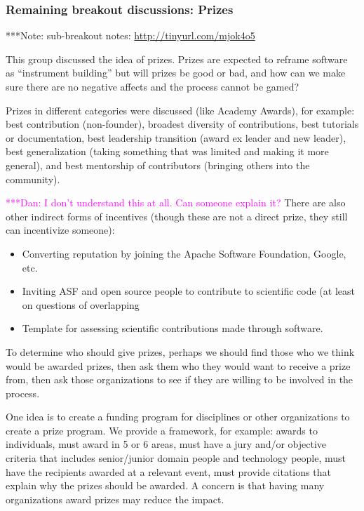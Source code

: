 \documentclass[11pt, oneside]{amsart}
\newcommand{\note}[1]{ {\textcolor{blueish}    { ***Note:      #1 }}}
\newcommand{\katznote}[1]{ {\textcolor{magenta}    { ***Dan:      #1 }}}
\begin{document}
\subsubsection{Remaining breakout discussions: Prizes}\label{sec:prizes}
\note{sub-breakout notes: \url{http://tinyurl.com/mjok4o5}}

This group discussed the idea of prizes.  Prizes are expected to reframe software
as ``instrument building'' but will prizes be good or bad, and how can we make sure
there are no negative affects and the process cannot be gamed?
  
Prizes in different categories were discussed (like Academy Awards), for example:
best contribution (non-founder),
broadest diversity of contributions,
best tutorials or documentation,
best leadership transition (award ex leader and new leader),
best generalization (taking something that was limited and making it more general), and
best mentorship of contributors (bringing others into the community).
 
\katznote{I don't understand this at all.  Can someone explain it?}
There are also other indirect forms of incentives
(though these are not a direct prize, they still can incentivize someone):
\begin{itemize}
\item Converting reputation by joining the Apache Software Foundation, Google, etc. 
\item Inviting ASF and open source people to contribute to scientific code (at
least on questions of overlapping
\item Template for assessing scientific contributions made through software.   
\end{itemize}

To determine who should give prizes, perhaps we should find those who we think would
be awarded prizes, then ask them who they would want to receive a prize from, then
ask those organizations to see if they are willing to be involved in the process.

One idea is to create a funding program for disciplines or other organizations to
create a prize program.  We provide a framework, for example: awards to individuals, must
award in 5 or 6 areas, must have a jury and/or objective criteria that includes
senior/junior domain people and technology people, must have the recipients awarded
at a relevant event, must provide citations that explain why the prizes should be awarded.
A concern is that having many organizations award prizes may reduce the impact.
\end{document}
